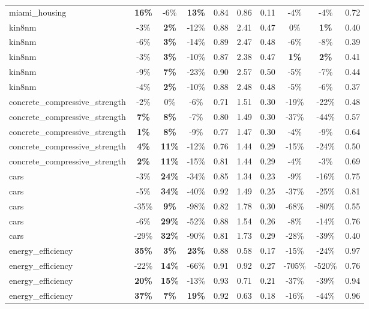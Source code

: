 \begin{table}[!htbp]
\begin{small}
\begin{sc}
{\begin{tabular}{lccccccccc}
miami\_housing & \textbf{16\%} & -6\% & \textbf{13\%} & 0.84 & 0.86 & 0.11 & -4\% & -4\% & 0.72 \\
kin8nm & -3\% & \textbf{2\%} & -12\% & 0.88 & 2.41 & 0.47 & 0\% & \textbf{1\%} & 0.40 \\
kin8nm & -6\% & \textbf{3\%} & -14\% & 0.89 & 2.47 & 0.48 & -6\% & -8\% & 0.39 \\
kin8nm & -3\% & \textbf{3\%} & -10\% & 0.87 & 2.38 & 0.47 & \textbf{1\%} & \textbf{2\%} & 0.41 \\
kin8nm & -9\% & \textbf{7\%} & -23\% & 0.90 & 2.57 & 0.50 & -5\% & -7\% & 0.44 \\
kin8nm & -4\% & \textbf{2\%} & -10\% & 0.88 & 2.48 & 0.48 & -5\% & -6\% & 0.37 \\
concrete\_compressive\_strength & -2\% & 0\% & -6\% & 0.71 & 1.51 & 0.30 & -19\% & -22\% & 0.48 \\
concrete\_compressive\_strength & \textbf{7\%} & \textbf{8\%} & -7\% & 0.80 & 1.49 & 0.30 & -37\% & -44\% & 0.57 \\
concrete\_compressive\_strength & \textbf{1\%} & \textbf{8\%} & -9\% & 0.77 & 1.47 & 0.30 & -4\% & -9\% & 0.64 \\
concrete\_compressive\_strength & \textbf{4\%} & \textbf{11\%} & -12\% & 0.76 & 1.44 & 0.29 & -15\% & -24\% & 0.50 \\
concrete\_compressive\_strength & \textbf{2\%} & \textbf{11\%} & -15\% & 0.81 & 1.44 & 0.29 & -4\% & -3\% & 0.69 \\
cars & -3\% & \textbf{24\%} & -34\% & 0.85 & 1.34 & 0.23 & -9\% & -16\% & 0.75 \\
cars & -5\% & \textbf{34\%} & -40\% & 0.92 & 1.49 & 0.25 & -37\% & -25\% & 0.81 \\
cars & -35\% & \textbf{9\%} & -98\% & 0.82 & 1.78 & 0.30 & -68\% & -80\% & 0.55 \\
cars & -6\% & \textbf{29\%} & -52\% & 0.88 & 1.54 & 0.26 & -8\% & -14\% & 0.76 \\
cars & -29\% & \textbf{32\%} & -90\% & 0.81 & 1.73 & 0.29 & -28\% & -39\% & 0.40 \\
energy\_efficiency & \textbf{35\%} & \textbf{3\%} & \textbf{23\%} & 0.88 & 0.58 & 0.17 & -15\% & -24\% & 0.97 \\
energy\_efficiency & -22\% & \textbf{14\%} & -66\% & 0.91 & 0.92 & 0.27 & -705\% & -520\% & 0.76 \\
energy\_efficiency & \textbf{20\%} & \textbf{15\%} & -13\% & 0.93 & 0.71 & 0.21 & -37\% & -39\% & 0.94 \\
energy\_efficiency & \textbf{37\%} & \textbf{7\%} & \textbf{19\%} & 0.92 & 0.63 & 0.18 & -16\% & -44\% & 0.96 \\

\end{tabular}}
\end{sc}
\end{small}
\end{table}

